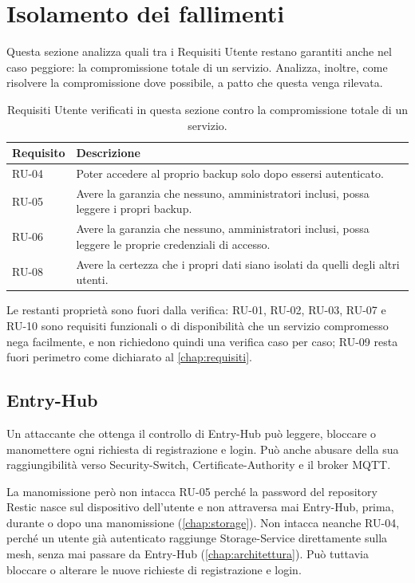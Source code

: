 \section{Isolamento dei fallimenti}

Questa sezione analizza quali tra i Requisiti Utente restano garantiti anche nel caso peggiore: la 
compromissione totale di un servizio.
Analizza, inoltre, come risolvere la compromissione dove possibile, a patto che questa venga rilevata.

\begin{table}[H]
\centering
\caption{Requisiti Utente verificati in questa sezione contro la compromissione totale di un servizio.}
\label{tab:ru-isolamento-fallimenti}
\begin{tabular}{@{}l p{}@{}}
\hline
\textbf{Requisito} & \textbf{Descrizione} \\
\hline
RU-04 & Poter accedere al proprio backup solo dopo essersi autenticato. \\
RU-05 & Avere la garanzia che nessuno, amministratori inclusi, possa leggere i propri backup. \\
RU-06 & Avere la garanzia che nessuno, amministratori inclusi, possa leggere le proprie credenziali di
accesso. \\
RU-08 & Avere la certezza che i propri dati siano isolati da quelli degli altri utenti. \\
\hline
\end{tabular}
\end{table}

Le restanti proprietà sono fuori dalla verifica: RU-01, RU-02, RU-03, RU-07 e RU-10 sono requisiti
funzionali o di disponibilità che un servizio compromesso nega facilmente, e non richiedono
quindi una verifica caso per caso; RU-09 resta fuori perimetro come dichiarato al \autoref{chap:requisiti}.

\subsection{Entry-Hub}

Un attaccante che ottenga il controllo di Entry-Hub può leggere, bloccare o manomettere ogni richiesta
di registrazione e login. Può anche abusare della sua raggiungibilità verso Security-Switch, 
Certificate-Authority e il broker MQTT.

La manomissione però non intacca RU-05 perché la password del repository Restic nasce sul dispositivo 
dell'utente e non attraversa mai Entry-Hub, prima, durante o dopo una manomissione (\autoref{chap:storage}).
Non intacca neanche RU-04, perché un utente già autenticato raggiunge Storage-Service direttamente sulla 
mesh, senza mai passare da Entry-Hub (\autoref{chap:architettura}). 
Può tuttavia bloccare o alterare le nuove richieste di registrazione e login.

